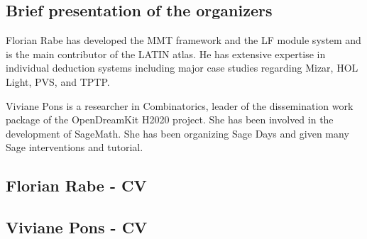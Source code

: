 \documentclass[a4paper,11pt]{article}
\begin{document}
\subsection{Brief presentation of the organizers}
Florian Rabe has developed the MMT framework and the LF module system and is the main contributor of the LATIN atlas. He has extensive expertise in individual deduction systems including major case studies regarding Mizar, HOL Light, PVS, and TPTP.

Viviane Pons is a researcher in Combinatorics, leader of the dissemination work package of the OpenDreamKit H2020 project. She has been involved in the development of SageMath. She has been organizing Sage Days and given many Sage interventions and tutorial.

 \newpage
  \subsection{Florian Rabe - CV}
    
    
  \newpage
  \subsection{Viviane Pons - CV}
    
\end{document}
